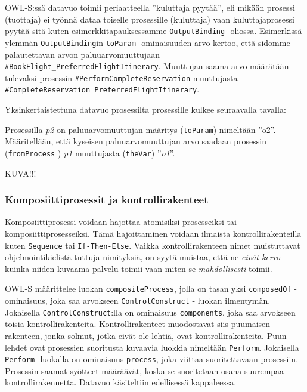 \documentclass[finnish]{tktltiki2}
\theoremstyle{definition}
\theoremstyle{remark}
\begin{document}
OWL-S:ssä datavuo toimii periaatteella ''kuluttaja pyytää'', eli mikään prosessi (tuottaja) ei työnnä dataa toiselle prosessille (kuluttaja) vaan kuluttajaprosessi pyytää sitä kuten esimerkkitapauksessamme \texttt{OutputBinding} -oliossa\cite{OWLS}. Esimerkissä ylemmän \texttt{OutputBinding}in \texttt{toParam} -ominaisuuden arvo kertoo, että sidomme palautettavan arvon paluuarvomuuttujaan \texttt{\#BookFlight\_PreferredFlightItinerary}. Muuttujan saama arvo määrätään tulevaksi prosessin  \texttt{\#PerformCompleteReservation} muuttujasta \texttt{\#CompleteReservation\_PreferredFlightItinerary}\cite{daml}. 

Yksinkertaistettuna datavuo prosessilta prosessille kulkee seuraavalla tavalla: 

Prosessilla \textit{p2} on paluuarvomuuttujan määritys (\texttt{toParam}) nimeltään ''o2''. Määritellään, että kyseisen paluuarvomuuttujan arvo saadaan prosessin (\texttt{fromProcess} ) \textit{p1} muuttujasta (\texttt{theVar}) ''\textit{o1}''.  

KUVA!!!

\subsubsection{Komposiittiprosessit ja kontrollirakenteet}

Komposiittiprosessi voidaan hajottaa atomisiksi prosesseiksi tai komposiittiprosesseiksi\cite{OWLS}. Tämä hajoittaminen voidaan ilmaista kontrollirakenteilla kuten \texttt{Sequence} tai \texttt{If-Then-Else}. Vaikka kontrollirakenteen nimet muistuttavat ohjelmointikielistä tuttuja nimityksiä, on syytä muistaa, että ne \textit{eivät kerro} kuinka niiden kuvaama palvelu toimii vaan miten se \textit{mahdollisesti} toimii\cite{OWLS}. 

OWL-S määrittelee luokan \texttt{compositeProcess}, jolla on tasan yksi \texttt{composedOf} -ominaisuus, joka saa arvokseen \texttt{ControlConstruct} - luokan ilmentymän. Jokaisella \texttt{ControlConstruct}:lla on ominaisuus \texttt{components}, joka saa arvokseen toisia kontrollirakenteita\cite{OWLS}. Kontrollirakenteet muodostavat siis puumaisen rakenteen, jonka solmut, jotka eivät ole lehtiä, ovat kontrollirakenteita. Puun lehdet ovat prosessien suoritusta kuvaavia luokkia nimeltään \texttt{Perform}. Jokaisella \texttt{Perform} -luokalla on ominaisuus \texttt{process}, joka viittaa suoritettavaan prosessiin\cite{OWLS}.  Prosessin saamat syötteet määräävät, koska se suoritetaan osana suurempaa kontrollirakennetta. Datavuo käsiteltiin edellisessä kappaleessa.
\end{document}

